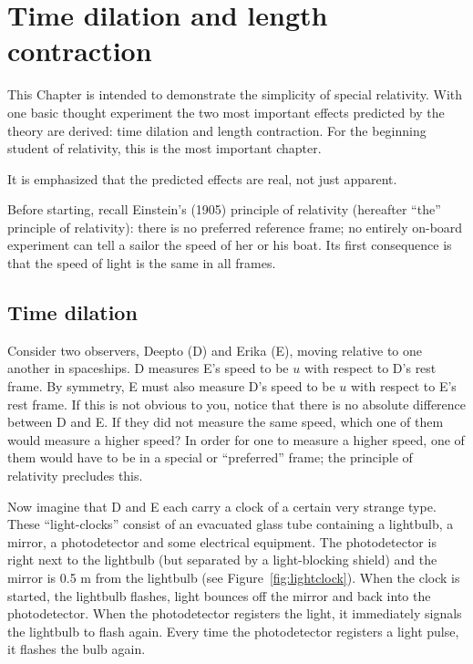 \chapter{Time dilation and length contraction}
\label{chap:time}

This Chapter is intended to demonstrate the simplicity of special
relativity.  With one basic thought experiment the two most important
effects predicted by the theory are derived: time dilation and length
contraction.  For the beginning student of relativity, this is the
most important chapter.

It is emphasized that the predicted effects are real, not just
apparent.

Before starting, recall Einstein's (1905) principle of relativity
(hereafter ``the'' principle of relativity): there is no preferred
reference frame; no entirely on-board experiment can tell a sailor the
speed of her or his boat.  Its first consequence is that the speed of
light is the same in all frames.


\section{Time dilation}
\label{sec:timedilation}

Consider two observers, Deepto (D) and Erika (E), moving relative to
one another in spaceships.  D measures E's speed to be $u$ with
respect to D's rest frame.  By symmetry, E must also measure D's speed
to be $u$ with respect to E's rest frame.  If this is not obvious to
you, notice that there is no absolute difference between D and E.  If
they did not measure the same speed, which one of them would measure a
higher speed?  In order for one to measure a higher speed, one of them
would have to be in a special or ``preferred'' frame; the principle of
relativity precludes this.

Now imagine that D and E each carry a clock of a certain very strange
type.  These ``light-clocks'' consist of an
evacuated glass tube containing a lightbulb, a mirror, a photodetector
and some electrical equipment.  The photodetector is right next to the
lightbulb (but separated by a light-blocking shield) and the mirror is
0.5 m from the lightbulb (see Figure~\ref{fig:lightclock}).  When the
clock is started, the lightbulb flashes, light bounces off the mirror
and back into the photodetector.  When the photodetector registers the
light, it immediately signals the lightbulb to flash again.  Every
time the photodetector registers a light pulse, it flashes the bulb
again.

